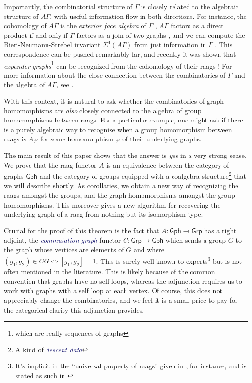 \documentclass[microtype]{gtpart}
\theoremstyle{definition}
\theoremstyle{theorem}
\newcommand*{\catFont}[1]{\mathsf{#1}}
\newcommand{\Grp}{\catFont{Grp}}
\newcommand*{\important}[1]{\textcolor{MidnightBlue}{\emph{#1}}}
\begin{document}
  Importantly, the combinatorial structure of $\Gamma$ is closely related to the 
  algebraic structure of $A \Gamma$, with useful information flow in both directions. 
  For instance, the cohomology of $A \Gamma$ is the \emph{exterior face algebra} 
  of $\Gamma$ \cite{sabalkaRigidityIsomorphismProblem2009},
  $A\Gamma$ factors as a direct product if and only if $\Gamma$ factors
  as a join of two graphs \cite{servatiusAutomorphismsGraphGroups1989},
  and we can compute the Bieri-Neumann-Strebel invariant $\Sigma^1(A\Gamma)$
  from just information in $\Gamma$ \cite{meierBieriNeumannStrebelInvariantsGraph1995}.
  This correspondence can be pushed remarkably far, and recently it was
  shown that \emph{expander graphs}\footnote{which are really sequences of graphs}
  can be recognized from the cohomology of their raags
  \cite{floresExpandersRightangledArtin2021}! For more information about the 
  close connection between the combinatorics of $\Gamma$ and the algebra of
  $A\Gamma$, see 
  \cite{floresExpandersRightangledArtin2021, koberdaGeometryCombinatoricsRightAngled2022}.
  
  With this context, it is natural to ask whether the combinatorics
  of graph homomorphisms are \emph{also} closely connected to the algebra of
  group homomorphisms between raags. For a particular example, one might ask 
  if there is a purely algebraic way to recognize when a group homomorphism 
  between raags is $A \varphi$ for some homomorphism $\varphi$ of their 
  underlying graphs.

  The main result of this paper shows
  that the answer is \emph{yes} in a very strong sense. We prove that the raag 
  functor $A$ is an equivalence between the category of graphs $\mathsf{Gph}$ 
  and the category of groups equipped with a 
  coalgebra structure\footnote{A kind of \important{descent data}}
  that we will describe shortly. As corollaries, we obtain a new way of
  recognizing the raags amongst the groups, and the graph homomorphisms 
  amongst the group homomorphisms. This moreover gives a new algorithm for 
  recovering the underlying graph of a raag from nothing but its isomorphism 
  type.

  Crucial for the proof of this theorem is the fact that 
  $A : \mathsf{Gph} \to \Grp$ has a right adjoint, the \important{commutation graph}
  functor $C : \Grp \to \mathsf{Gph}$ which sends a group $G$ to the graph 
  whose vertices are elements of $G$ and where $(g_1,g_2) \in CG \iff [g_1,g_2]=1$. 
  This is surely well known to 
  experts\footnote{It's implicit in the ``universal property of raags'' given 
  in \cite{koberdaRightangledArtinGroups2012}, for instance, and is stated as
  such in \cite{servatiusAutomorphismsGraphGroups1989}} but is not often 
  mentioned in the literature. This is likely because of the common convention that graphs 
  have no self loops, whereas the adjunction requires us to work with graphs
  with a self loop at each vertex. Of course, this does not appreciably 
  change the combinatorics, and we feel it is a small price to pay for the 
  categorical clarity this adjunction provides.
\end{document}
